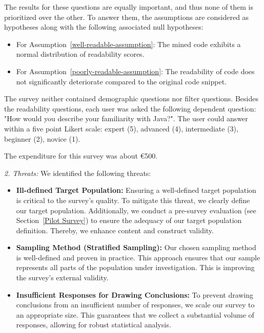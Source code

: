 \documentclass[%
class=scrreprt,
chapterprefix=false,%
open=right,%
twoside=false,%
paper=a4,%
logofile={Logo\_zentral\_farbig\_EN.png},%
thesistype=master,%
UKenglish,%
]{se2thesis}
\theoremstyle{definition}
\begin{document}
	The results for these questions are equally important, and thus none of them is prioritized over the other.
	To answer them, the assumptions	are considered as hypotheses along with the following associated null hypotheses:
	\begin{itemize}
		\item For Assumption~\ref{well-readable-assumption}: The mined code exhibits a normal distribution of readability scores.
		\item For Assumption~\ref{poorly-readable-assumption}: The readability of code does not significantly deteriorate compared to the original code snippet.
	\end{itemize}
	
	The survey neither contained demographic questions nor filter questions. Besides the readability questions, each user was asked the following dependent question: "How would you describe your familiarity with Java?". The user could answer within a five point Likert scale: expert (5), advanced (4), intermediate (3), beginner (2), novice (1).
	
	The expenditure for this survey was about €500.				
	
\textit{2. Threats:}
	We identified the following threats:
	\begin{itemize}
		\item \textbf{Ill-defined Target Population:} Ensuring a well-defined target population is critical to the survey's quality. To mitigate this threat, we clearly define our target population. Additionally, we conduct a pre-survey evaluation (see Section~\ref{Pilot Survey}) to ensure the adequacy of our target population definition. Thereby, we enhance content and construct validity.
		
		\item \textbf{Sampling Method (Stratified Sampling):} Our chosen sampling method is well-defined and proven in practice. This approach ensures that our sample represents all parts of the population under investigation. This is improving the survey's external validity.
		
		\item \textbf{Insufficient Responses for Drawing Conclusions:} To prevent drawing conclusions from an insufficient number of responses, we scale our survey to an appropriate size. This guarantees that we collect a substantial volume of responses, allowing for robust statistical analysis.
	\end{itemize}
	
\end{document}
